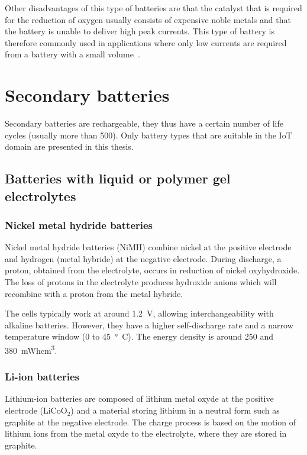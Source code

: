 \documentclass{EPL-master-thesis-covers-EN}
\begin{document}
Other disadvantages of this type of batteries are that the catalyst that is required for the reduction of oxygen usually consists of expensive noble metals and that the battery is unable to deliver high peak currents. This type of battery is therefore commonly used in applications where only low
currents are required from a battery with a small volume~\cite{doi:10.1002/er.2949}.

\section{Secondary batteries}

Secondary batteries are rechargeable, they thus have a certain number of life cycles (usually more than 500). Only battery types that are suitable in the IoT domain are presented in this thesis.

\subsection*{Batteries with liquid or polymer gel electrolytes}


\subsubsection*{Nickel metal hydride batteries}

Nickel metal hydride batteries (NiMH) combine nickel at the positive electrode and hydrogen (metal hybride) at the negative electrode.  During discharge, a proton, obtained from the electrolyte, occurs in reduction of nickel oxyhydroxide. The loss of protons in the electrolyte produces hydroxide anions which will recombine with a proton from the metal hybride.

The cells typically work at around \SI{1.2}{V}, allowing interchangeability with alkaline batteries. However, they have a higher self-discharge rate and a narrow temperature window (0 to \SI{45}{\degree C}). The energy density is around 250 and \SI{380}{mWhcm^3}.

\subsubsection*{Li-ion batteries}

Lithium-ion batteries are composed of lithium metal oxyde at the positive electrode (LiCoO${}_2$) and a material storing lithium in a neutral form such as graphite at the negative electrode. The charge process is based on the motion of lithium ions from the metal oxyde to the electrolyte, where they are stored in graphite.
\end{document}
